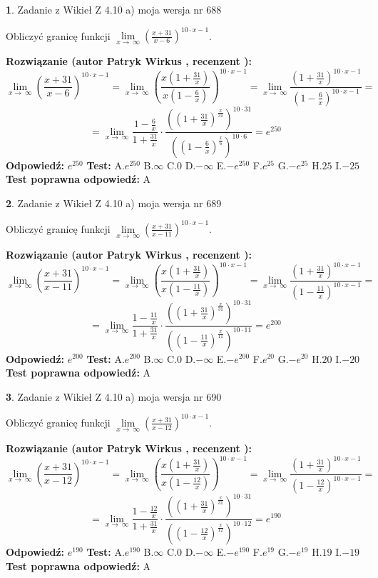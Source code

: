 \documentclass[12pt, a4paper]{article}
\theoremstyle{definition} %
\newtheorem{zad}{}
\newcommand{\zadStart}[1]{\begin{zad}#1\newline}
\newcommand{\zadStop}{\end{zad}}
\newcommand{\rozwStart}[2]{\noindent \textbf{Rozwiązanie (autor #1 , recenzent #2): }\newline}
\newcommand{\rozwStop}{\newline}
\newcommand{\odpStart}{\noindent \textbf{Odpowiedź:}\newline}
\newcommand{\odpStop}{\newline}
\newcommand{\testStart}{\noindent \textbf{Test:}\newline}
\newcommand{\testStop}{\newline}
\newcommand{\kluczStart}{\noindent \textbf{Test poprawna odpowiedź:}\newline}
\newcommand{\kluczStop}{\newline}
\begin{document}
\zadStart{Zadanie z Wikieł Z 4.10 a) moja wersja nr 688}

Obliczyć granicę funkcji  $\lim\limits_{x\to\ \infty}(\frac{x+31}{x-6})^{10\cdot x-1}$.
\zadStop
\rozwStart{Patryk Wirkus}{}
$$\lim\limits_{x\to\ \infty}(\frac{x+31}{x-6})^{10\cdot x-1} = \lim\limits_{x\to\ \infty}(\frac{x(1+\frac{31}{x})}{x(1-\frac{6}{x})})^{10\cdot x-1}=\lim\limits_{x\to\ \infty}\frac{(1+\frac{31}{x})^{10\cdot x-1}}{(1-\frac{6}{x})^{10\cdot x-1}}=$$
$$=\lim\limits_{x\to\ \infty}\frac{1-\frac{6}{x}}{1+\frac{31}{x}}\cdot\frac{((1+\frac{31}{x})^{\frac{x}{31}})^{10\cdot31}}{((1-\frac{6}{x})^{\frac{x}{6}})^{10\cdot6}}=e^{250}$$
\rozwStop
\odpStart
$e^{250}$
\odpStop
\testStart
A.$e^{250}$ B.$\infty$ C.$0$ D.$-\infty$ E.$-e^{250}$
F.$e^{25}$ G.$-e^{25}$
H.$25$
I.$-25$
\testStop
\kluczStart
A
\kluczStop



\zadStart{Zadanie z Wikieł Z 4.10 a) moja wersja nr 689}

Obliczyć granicę funkcji  $\lim\limits_{x\to\ \infty}(\frac{x+31}{x-11})^{10\cdot x-1}$.
\zadStop
\rozwStart{Patryk Wirkus}{}
$$\lim\limits_{x\to\ \infty}(\frac{x+31}{x-11})^{10\cdot x-1} = \lim\limits_{x\to\ \infty}(\frac{x(1+\frac{31}{x})}{x(1-\frac{11}{x})})^{10\cdot x-1}=\lim\limits_{x\to\ \infty}\frac{(1+\frac{31}{x})^{10\cdot x-1}}{(1-\frac{11}{x})^{10\cdot x-1}}=$$
$$=\lim\limits_{x\to\ \infty}\frac{1-\frac{11}{x}}{1+\frac{31}{x}}\cdot\frac{((1+\frac{31}{x})^{\frac{x}{31}})^{10\cdot31}}{((1-\frac{11}{x})^{\frac{x}{11}})^{10\cdot11}}=e^{200}$$
\rozwStop
\odpStart
$e^{200}$
\odpStop
\testStart
A.$e^{200}$ B.$\infty$ C.$0$ D.$-\infty$ E.$-e^{200}$
F.$e^{20}$ G.$-e^{20}$
H.$20$
I.$-20$
\testStop
\kluczStart
A
\kluczStop



\zadStart{Zadanie z Wikieł Z 4.10 a) moja wersja nr 690}

Obliczyć granicę funkcji  $\lim\limits_{x\to\ \infty}(\frac{x+31}{x-12})^{10\cdot x-1}$.
\zadStop
\rozwStart{Patryk Wirkus}{}
$$\lim\limits_{x\to\ \infty}(\frac{x+31}{x-12})^{10\cdot x-1} = \lim\limits_{x\to\ \infty}(\frac{x(1+\frac{31}{x})}{x(1-\frac{12}{x})})^{10\cdot x-1}=\lim\limits_{x\to\ \infty}\frac{(1+\frac{31}{x})^{10\cdot x-1}}{(1-\frac{12}{x})^{10\cdot x-1}}=$$
$$=\lim\limits_{x\to\ \infty}\frac{1-\frac{12}{x}}{1+\frac{31}{x}}\cdot\frac{((1+\frac{31}{x})^{\frac{x}{31}})^{10\cdot31}}{((1-\frac{12}{x})^{\frac{x}{12}})^{10\cdot12}}=e^{190}$$
\rozwStop
\odpStart
$e^{190}$
\odpStop
\testStart
A.$e^{190}$ B.$\infty$ C.$0$ D.$-\infty$ E.$-e^{190}$
F.$e^{19}$ G.$-e^{19}$
H.$19$
I.$-19$
\testStop
\kluczStart
A
\kluczStop
\end{document}

